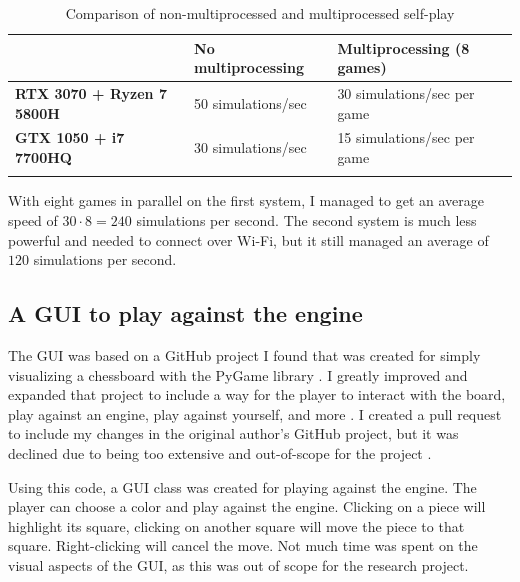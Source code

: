 \documentclass{article}
\begin{document}
\begin{table}[h!]
    \begin{tabularx}{\textwidth}{@{}Lll@{}}
    \toprule
    & \textbf{No multiprocessing} & \textbf{Multiprocessing (8 games)} \\ 
    \midrule 
    \textbf{RTX 3070 + Ryzen 7 5800H} & 50 simulations/sec & 30 simulations/sec per game \\ \addlinespace
    \textbf{GTX 1050 + i7 7700HQ} & 30 simulations/sec & 15 simulations/sec per game \\ \addlinespace
    
    \bottomrule
    \end{tabularx} 
    \caption{Comparison of non-multiprocessed and multiprocessed self-play}
\end{table}

With eight games in parallel on the first system, I managed to get an average speed of $30 \cdot 8 = 240$ simulations per second.
The second system is much less powerful and needed to connect over Wi-Fi, but it still managed an average of $120$ simulations per second. 

\subsection{A GUI to play against the engine}

The GUI was based on a GitHub project I found that was created for simply visualizing a chessboard with the PyGame library \cite{adefokunChessboardAhirajustice2022, pygame}.
I greatly improved and expanded that project to include a way for the player to interact with the board, play against an engine,
play against yourself, and more \cite{zjefferChessboardZjeffer2022}. I created a pull request to include my changes in the original author's GitHub project,
but it was declined due to being too extensive and out-of-scope for the project \cite{adefokunChessboard2022pull}.

Using this code, a GUI class was created for playing against the engine. The player can choose a color and play against
the engine. Clicking on a piece will highlight its square, clicking on another square will move the piece to that square.
Right-clicking will cancel the move. Not much time was spent on the visual aspects of the GUI, as this was out of scope
for the research project. 
\end{document}
